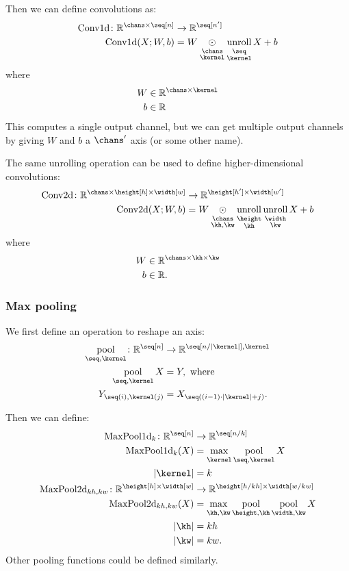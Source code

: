 \documentclass{article}
\newcommand{\reals}{\mathbb{R}}
\begin{document}
Then we can define convolutions as:
\begin{align*}
\text{Conv1d} \colon \reals^{\chans \times \seq[n]} &\rightarrow \mathbb{R}^{\seq[n']} \\
\text{Conv1d}(X; W, b) &= W \ndot{\chans \\ \kernel} \nfun{\seq \\ \kernel}{unroll} X + b
\end{align*}
where
\begin{align*}
W &\in \reals^{\chans \times \kernel} \\
b &\in \reals \\
\end{align*}
This computes a single output channel, but we can get multiple output channels by giving $W$ and $b$ a $\chans'$ axis (or some other name).

The same unrolling operation can be used to define higher-dimensional convolutions:
\begin{align*}
  \text{Conv2d} \colon \reals^{\chans \times \height[h] \times \width[w]}
  &\rightarrow \reals^{\height[h'] \times \width[w']} \\
  \text{Conv2d}(X; W, b) &= W \ndot{\chans \\ \kh, \kw} \nfun{\height \\ \kh}{unroll} \nfun{\width\\\kw}{unroll} X + b
\end{align*}  
where
\begin{align*}
W &\in \reals^{\chans \times \kh \times \kw} \\
b &\in \reals.
\end{align*}

\subsubsection{Max pooling}

We first define an operation to reshape an axis:
\begin{align*}
  \nfun{\seq,\kernel}{pool} \colon \reals^{\seq[n]} &\rightarrow \reals^{\seq[n/|\kernel|],\kernel} \\
  \nfun{\seq,\kernel}{pool} X &= Y,\ \text{where} \\
  Y_{\seq(i), \kernel(j)} &= X_{\seq((i-1) \cdot |\kernel| + j)}.
\end{align*}

Then we can define:
\begin{align*}
\text{MaxPool1d}_{k} \colon \mathbb{R}^{\seq[n]} &\rightarrow \mathbb{R}^{\seq[n/k]} \\
\text{MaxPool1d}_{k}(X) &= \nfun{\kernel}{max} \nfun{\seq,\kernel}{pool} X \\
|\kernel| &= k \\
\text{MaxPool2d}_{kh,kw} \colon \mathbb{R}^{\height[h] \times \width[w]} &\rightarrow \mathbb{R}^{\height[h/kh] \times \width[w/kw]} \\
\text{MaxPool2d}_{kh,kw}(X) &= \nfun{\kh,\kw}{max} \nfun{\height,\kh}{pool} \nfun{\width,\kw}{pool} X \\
|\kh| &= kh \\
|\kw| &= kw.
\end{align*}
Other pooling functions could be defined similarly.
\end{document}
